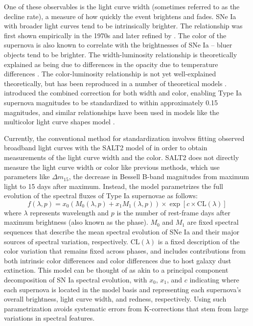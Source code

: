 One of these observables is the light curve width (sometimes referred to as the decline rate), a measure of how quickly the event brightens and fades. SNe Ia with broader light curves tend to be intrinsically brighter. The relationship was first shown empirically in the 1970s \citet{rust_use_1974, pskovskii_light_1977} and later refined by \citet{phillips_absolute_1993}. The color of the supernova is also known to correlate with the brightnesses of SNe Ia -- bluer objects tend to be brighter. The width-luminosity relationship is theoretically explained as being due to differences in the opacity due to temperature differences \citep{kasen_origin_2007}. The color-luminosity relationship is not yet well-explained theoretically, but has been reproduced in a number of theoretical models \citep{kasen_diversity_2009}. \citet{tripp_two-parameter_1998} introduced the combined correction for both width and color, enabling Type Ia supernova magnitudes to be standardized to within approximately 0.15 magnitudes, and similar relationships have been used in models like the multicolor light curve shapes model \citep[MLCS,][]{riess_precise_1996}.

Currently, the conventional method for standardization involves fitting observed broadband light curves with the SALT2 model of \citet{guy_salt2_2007} in order to obtain measurements of the light curve width and the color. SALT2 does not directly measure the light curve width or color like previous methods, which use parameters like $\Delta m_{15}$, the decrease in Bessell B-band magnitudes from maximum light to 15 days after maximum. Instead, the model parametrizes the full evolution of the spectral fluxes of Type Ia supernovae as follows:
\begin{equation}
    f(\lambda, p) = x_0\left(M_0(\lambda, p) + x_1 M_1(\lambda, p)\right) \times \exp [c\times\textrm{CL}(\lambda)]
    \label{eqn:salt_flux}
\end{equation}
where $\lambda$ represents wavelength and $p$ is the number of rest-frame days after maximum brightness (also known as the phase). $M_0$ and $M_1$ are fixed spectral sequences that describe the mean spectral evolution of SNe Ia and their major sources of spectral variation, respectively. $\textrm{CL}(\lambda)$ is a fixed description of the color variation that remains fixed across phases, and includes contributions from both intrinsic color differences and color differences due to host galaxy dust extinction. This model can be thought of as akin to a principal component decomposition of SN Ia spectral evolution, with $x_0$, $x_1$, and $c$ indicating where each supernova is located in the model basis and representing each supernova's overall brightness, light curve width, and redness, respectively. Using such parametrization avoids systematic errors from K-corrections that stem from large variations in spectral features.

